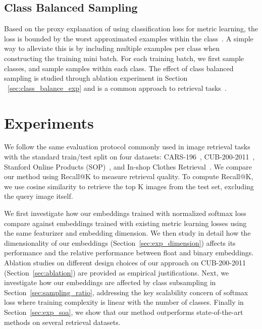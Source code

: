 \documentclass{bmvc2k}
\begin{document}
\subsection{Class Balanced Sampling}
\label{subsec:sampling}
Based on the proxy explanation of using classification loss for metric learning, the loss is bounded by the worst approximated examples within the class~\cite{nofusslearning}. A simple way to alleviate this is by including multiple examples per class when constructing the training mini batch. For each training batch, we first sample  classes, and sample  samples within each class. The effect of class balanced sampling is studied through ablation experiment in Section ~\ref{sec:class_balance_exp} and is a common approach to retrieval tasks~\cite{samplingmatters, npairNIPS2016}.
 


\section{Experiments}
\label{sec:experiments}

We follow the same evaluation protocol commonly used in image retrieval tasks with the standard train/test split on four datasets: CARS-196~\cite{cars196}, CUB-200-2011~\cite{cub200}, Stanford Online Products (SOP)~\cite{songCVPR16}, and In-shop Clothes Retrieval~\cite{liu2016deepfashion}. We compare our method using Recall@K to measure retrieval quality. To compute Recall@K, we use cosine similarity to retrieve the top K images from the test set, excluding the query image itself.

We first investigate how our embeddings trained with normalized softmax loss compare against embeddings trained with existing metric learning losses using the same featurizer and embedding dimension. We then study in detail how the dimensionality of our embeddings (Section~\ref{sec:exp_dimension}) affects its performance and the relative performance between float and binary embeddings. Ablation studies on different design choices of our approach on CUB-200-2011~\cite{cub200} (Section~\ref{sec:ablation}) are provided as empirical justifications. Next, we investigate how our embeddings are affected by class subsampling in Section~\ref{sec:sampling_ratio}, addressing the key scalability concern of softmax loss where training complexity is linear with the number of classes. Finally in Section~\ref{sec:exp_soa}, we show that our method outperforms state-of-the-art methods on several retrieval datasets.
\end{document}
